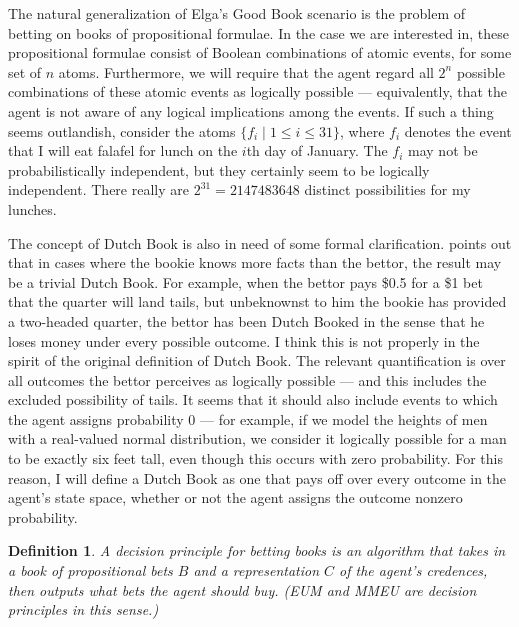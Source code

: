 \documentclass[letterpaper,12pt]{article}
\renewcommand{\phi}{\varphi}
\newtheorem{definition}{Definition}
\begin{document}
The natural generalization of Elga's Good Book scenario is the problem of betting on books of propositional formulae. In the case we are interested in, these propositional formulae consist of Boolean combinations of atomic events, for some set of $n$ atoms. Furthermore, we will require that the agent regard all $2^n$ possible combinations of these atomic events as logically possible --- equivalently, that the agent is not aware of any logical implications among the events. If such a thing seems outlandish, consider the atoms $\{f_i \mid 1 \leq i \leq 31\}$, where $f_i$ denotes the event that I will eat falafel for lunch on the $i$th day of January. The $f_i$ may not be probabilistically independent, but they certainly seem to be logically independent. There really are $2^{31} = 2147483648$ distinct possibilities for my lunches.


The concept of Dutch Book is also in need of some formal clarification. \cite{hacking1967} points out that in cases where the bookie knows more facts than the bettor, the result may be a trivial Dutch Book. For example, when the bettor pays \$0.5 for a \$1 bet that the quarter will land tails, but unbeknownst to him the bookie has provided a two-headed quarter, the bettor has been Dutch Booked in the sense that he loses money under every possible outcome. I think this is not properly in the spirit of the original definition of Dutch Book. The relevant quantification is over all outcomes the bettor perceives as logically possible --- and this includes the excluded possibility of tails. It seems that it should also include events to which the agent assigns probability $0$ --- for example, if we model the heights of men with a real-valued normal distribution, we consider it logically possible for a man to be exactly six feet tall, even though this occurs with zero probability. For this reason, I will define a Dutch Book as one that pays off over every outcome in the agent's state space, whether or not the agent assigns the outcome nonzero probability.

\begin{definition}
\label{decisionPrinciple}
A \emph{decision principle} for betting books is an algorithm that takes in a book of propositional bets $B$ and a representation $C$ of the agent's credences, then outputs what bets the agent should buy. (EUM and MMEU are decision principles in this sense.)
\end{definition}
\end{document}

